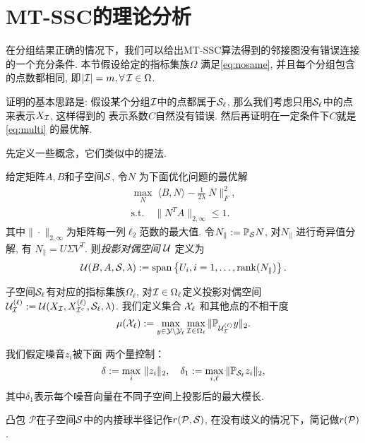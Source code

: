 \section{MT-SSC的理论分析}\label{sec:proof_multi}
在分组结果正确的情况下，我们可以给出MT-SSC算法得到的邻接图没有错误连接
的一个充分条件. 本节假设给定的指标集族\(\Omega\) 满足\eqref{eq:nosame},
并且每个分组包含的点数都相同, 即\(|\mathcal{I}|=m, \forall\, \mathcal{I} \in \Omega\).

证明的基本思路是: 假设某个分组\(\mathcal{I}\)中的点都属于\(\mathcal{S}_\ell\),
那么我们考虑只用\(\mathcal{S}_\ell\)中的点来表示\(X_{\mathcal{I}}\), 这样得到的
表示系数\(C\)自然没有错误. 然后再证明在一定条件下\(C\)就是\eqref{eq:multi}
的最优解.

先定义一些概念，它们类似\cite{soltanolkotabi2012geometric}中的提法.
\begin{definition}[投影对偶空间]\label{def:proj_dual_direction}
  给定矩阵\(A,B\)和子空间\(\mathcal{S}\), 令\(N\) 为下面优化问题的最优解
  \begin{gather*}
    \max_{N} \; \langle B, N \rangle - \frac{1}{2\lambda}\ N\|_F^2,\\
    \text{s.t.}\quad \|N^T A\|_{2, \infty} \leq 1.
  \end{gather*}
  其中\(\|\cdot\|_{2,\infty}\)为矩阵每一列\(\ell_2\)范数的最大值.
  令\( N_\parallel := \mathbb{P}_{\mathcal{S}} N\), 对\(N_\parallel\) 进行奇异值分解, 有
  \( N_\parallel = U \Sigma V^T\). 则\emph{投影对偶空间} \(\mathcal{U}\) 定义为
  \[\mathcal{U}(B,A,\mathcal{S},\lambda):= \operatorname{span} \left\{U_i, i = 1,\ldots, \operatorname{rank}(N_\parallel)
  \right\}.\]
\end{definition}

\begin{definition}[子空间的不相干度]\label{def:incoherence}
  子空间\(\mathcal{S}_\ell\)有对应的指标集族\(\Omega_\ell\), 
  对\(\mathcal{I}\in \Omega_\ell\)定义投影对偶空间 \(\mathcal{U}_{\mathcal{I}}^{(\ell)}:=\mathcal{U}(X_{\mathcal{I}},
  X_{\mathcal{I}^c}^{(\ell)},\mathcal{S}_{\ell},\lambda)\).
  我们定义集合 \(\mathcal{X}_\ell\) 和其他点的不相干度
  \[
     \mu(\mathcal{X}_{\ell}) := \max_{y\in \mathcal{Y}\setminus \mathcal{Y}_{\ell}}
     \max_{\mathcal{I} \in \Omega_\ell} \|\mathbb{P}_{\mathcal{U}_{\mathcal{I}}^{(\ell)}} y\|_2. 
   \]
\end{definition} 

\begin{definition}[控制噪音]\label{def:noise} 
  我们假定噪音\(z_i\)被下面 两个量控制： 
  \[ \delta:=\max_i\, \|z_i\|_2, \quad \delta_1:=\max_{i,\ell} \|\mathbb{P}_{\mathcal{S}_\ell} z_i\|_2,\]
其中\(\delta_1\)表示每个噪音向量在不同子空间上投影后的最大模长.  
\end{definition} 

\begin{definition}[内接球半径] 凸包 \(\mathcal{P}\)在子空间\(\mathcal{S}\)中的内接球半径记作\(r(\mathcal{P},\mathcal{S})\),
  在没有歧义的情况下，简记做\(r(\mathcal{P})\). 
\end{definition}

